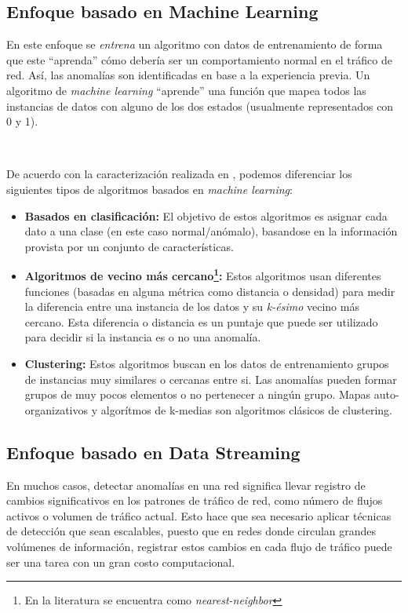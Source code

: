 \documentclass[a4paper,12pt, oneside]{article}
\begin{document}
\subsection{Enfoque basado en Machine Learning}
En este enfoque se \textit{entrena} un algoritmo con datos de entrenamiento de forma que este ``aprenda'' cómo debería ser un comportamiento normal en el tráfico de red. Así, las anomalías son identificadas en base a la experiencia previa. Un algoritmo de \textit{machine learning} ``aprende'' una función que mapea todos las instancias de datos con alguno de los dos estados (usualmente representados con 0 y 1).

\

De acuerdo con la caracterización realizada en \cite{Chandola:2009:ADS:1541880.1541882}, podemos diferenciar los siguientes tipos de algoritmos basados en \textit{machine learning}:
\begin{itemize}
	\item \textbf{Basados en clasificación:} El objetivo de estos algoritmos es asignar cada dato a una clase (en este caso normal/anómalo), basandose en la información provista por un conjunto de características.
	\item \textbf{Algoritmos de vecino más cercano\footnote{En la literatura se encuentra como \textit{nearest-neighbor}}:} Estos algoritmos usan diferentes funciones (basadas en alguna métrica como distancia o densidad) para medir la diferencia entre una instancia de los datos y su \textit{k-ésimo} vecino más cercano\cite{Chandola:2009:ADS:1541880.1541882}. Esta diferencia o distancia es un puntaje que puede ser utilizado para decidir si la instancia es o no una anomalía.
	\item \textbf{Clustering:} Estos algoritmos buscan en los datos de entrenamiento grupos de instancias muy similares o cercanas entre si. Las anomalías pueden formar grupos de muy pocos elementos o no pertenecer a ningún grupo. Mapas auto-organizativos\cite{Kohonen:1997:SM:261082} y algorítmos de k-medias\cite{Hartigan/Wong:79} son algoritmos clásicos de clustering.
\end{itemize}

\subsection{Enfoque basado en Data Streaming}
En muchos casos, detectar anomalías en una red significa llevar registro de cambios significativos en los patrones de tráfico de red, como número de flujos activos o volumen de tráfico actual. Esto hace que sea necesario aplicar técnicas de detección que sean escalables, puesto que en redes donde circulan grandes volúmenes de información, registrar estos cambios en cada flujo de tráfico puede ser una tarea con un gran costo computacional.
\end{document}
